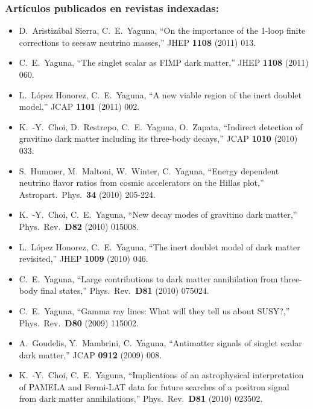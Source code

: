 \subsubsection{Artículos publicados en revistas indexadas:}
\begin{itemize}
\item   D.~Aristizábal Sierra, C.~E.~Yaguna,
  ``On the importance of the 1-loop finite corrections to seesaw neutrino masses,''
  JHEP {\bf 1108 } (2011)  013.

\item   C.~E.~Yaguna,
  ``The singlet scalar as FIMP dark matter,''
  JHEP {\bf 1108 } (2011)  060.

\item   L.~López Honorez, C.~E.~Yaguna,
  ``A new viable region of the inert doublet model,''
  JCAP {\bf 1101 } (2011)  002.

\item   K.~-Y.~Choi, D.~Restrepo, C.~E.~Yaguna, O.~Zapata,
  ``Indirect detection of gravitino dark matter including its three-body decays,''
  JCAP {\bf 1010 } (2010)  033.

\item   S.~Hummer, M.~Maltoni, W.~Winter, C.~Yaguna,
  ``Energy dependent neutrino flavor ratios from cosmic accelerators on the Hillas plot,''
  Astropart.\ Phys.\  {\bf 34 } (2010)  205-224.

\item   K.~-Y.~Choi, C.~E.~Yaguna,
  ``New decay modes of gravitino dark matter,''
  Phys.\ Rev.\  {\bf D82 } (2010)  015008.

\item   L.~López Honorez, C.~E.~Yaguna,
  ``The inert doublet model of dark matter revisited,''
  JHEP {\bf 1009 } (2010)  046.

\item   C.~E.~Yaguna,
  ``Large contributions to dark matter annihilation from three-body final states,''
  Phys.\ Rev.\  {\bf D81 } (2010)  075024.

\item   C.~E.~Yaguna,
  ``Gamma ray lines: What will they tell us about SUSY?,''
  Phys.\ Rev.\  {\bf D80 } (2009)  115002.

\item   A.~Goudelis, Y.~Mambrini, C.~Yaguna,
  ``Antimatter signals of singlet scalar dark matter,''
  JCAP {\bf 0912 } (2009)  008.

\item   K.~-Y.~Choi, C.~E.~Yaguna,
  ``Implications of an astrophysical interpretation of PAMELA and Fermi-LAT data for future searches of a positron signal from dark matter annihilations,''
  Phys.\ Rev.\  {\bf D81 } (2010)  023502.

\end{itemize}
